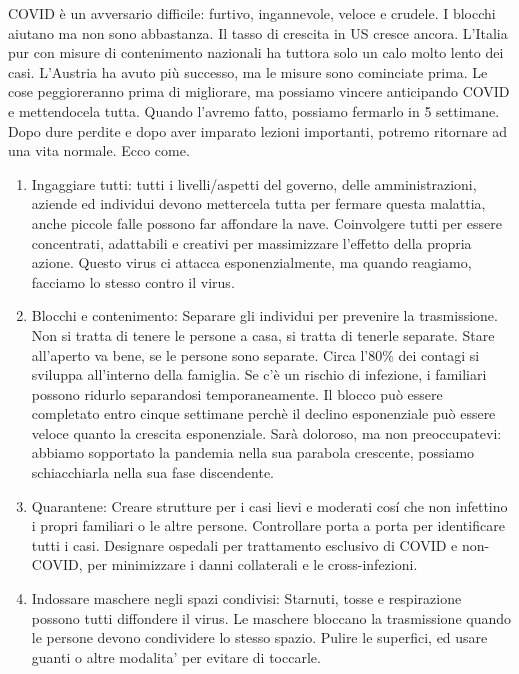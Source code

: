 \documentclass[onecolumn,journal]{IEEEtran}
\begin{document}
\begin{multicols}{2}
COVID è un avversario difficile: furtivo, ingannevole, veloce e crudele. I blocchi aiutano ma non sono abbastanza. Il tasso di crescita in US cresce ancora. L'Italia pur con misure di contenimento nazionali ha tuttora solo un calo molto lento dei casi. L'Austria ha avuto più successo, ma le misure sono cominciate prima. Le cose peggioreranno prima di migliorare, ma possiamo vincere anticipando COVID e mettendocela tutta. Quando l'avremo fatto, possiamo fermarlo in 5 settimane. Dopo dure perdite e dopo aver imparato lezioni importanti, potremo ritornare ad una vita normale. Ecco come.

\begin{enumerate}
\item Ingaggiare tutti: tutti i livelli/aspetti del governo, delle amministrazioni, aziende ed individui devono mettercela tutta per fermare questa malattia, anche piccole falle possono far affondare la nave. Coinvolgere tutti per essere concentrati, adattabili e creativi per massimizzare l'effetto della propria azione. Questo virus ci attacca esponenzialmente, ma quando reagiamo, facciamo lo stesso contro il virus.

\item Blocchi e contenimento: Separare gli individui per prevenire la trasmissione. Non si tratta di tenere le persone a casa, si tratta di tenerle separate. Stare all'aperto va bene, se le persone sono separate. Circa l'80\% dei contagi si sviluppa all'interno della famiglia. Se c'è un rischio di infezione, i familiari possono ridurlo separandosi temporaneamente. Il blocco può essere completato entro cinque settimane perchè il declino esponenziale può essere veloce quanto la crescita esponenziale. Sarà doloroso, ma non preoccupatevi: abbiamo sopportato la pandemia nella sua parabola crescente, possiamo schiacchiarla nella sua fase discendente.

\item Quarantene: Creare strutture per i casi lievi e moderati cosí che non infettino i propri familiari o le altre persone. Controllare porta a porta per identificare tutti i casi. Designare ospedali per trattamento esclusivo di COVID e non-COVID, per minimizzare i danni collaterali e le cross-infezioni.

\item Indossare maschere negli spazi condivisi: Starnuti, tosse e respirazione possono tutti diffondere il virus. Le maschere bloccano la trasmissione quando le persone devono condividere lo stesso spazio. Pulire le superfici, ed usare guanti o altre modalita' per evitare di toccarle.


\end{enumerate}
\end{multicols}
\end{document}
